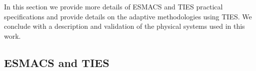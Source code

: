 


In this section we provide more details of ESMACS and TIES practical 
specifications and provide details on the adaptive methodologies using TIES. We 
conclude with a description and validation of the physical systems used in this
work. 



\subsection{ESMACS and TIES}\label{ssec:esm_ties}








